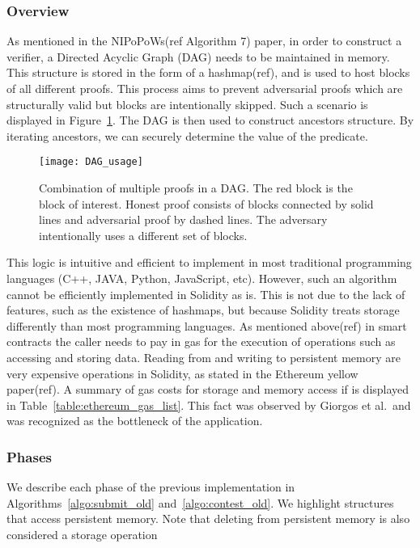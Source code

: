 \subsubsection{Overview} As mentioned in the NIPoPoWs(ref Algorithm 7) paper,
in order to construct a verifier, a Directed Acyclic Graph (DAG) needs to be
maintained in memory. This structure is stored in the form of a hashmap(ref),
and is used to host blocks of all different proofs. This process aims to
prevent adversarial proofs which are structurally valid but blocks are
intentionally skipped. Such a scenario is displayed in
Figure~\ref{fig:DAG_usage}. The DAG is then used to construct ancestors
structure. By iterating ancestors, we can securely determine the value of the
predicate.

\begin{figure}[hbt]
    \centering
    \texttt{[image: DAG\_usage]}
    \caption{Combination of multiple proofs in a DAG. The red block is the
        block of interest. Honest proof consists of blocks connected by solid
        lines and adversarial proof by dashed lines. The adversary
        intentionally uses a different set of blocks.}
    \label{fig:DAG_usage}
\end{figure}

This logic is intuitive and efficient to implement in most traditional
programming languages (C++, JAVA, Python, JavaScript, etc). However, such an
algorithm cannot be efficiently implemented in Solidity as is. This is not due
to the lack of features, such as the existence of hashmaps, but because
Solidity treats storage differently than most programming languages. As
mentioned above(ref) in smart contracts the caller needs to pay in gas for the
execution of operations such as accessing and storing data. Reading from and
writing to persistent memory are very expensive operations in Solidity, as
stated in the Ethereum yellow paper(ref). A summary of gas costs for storage
and memory access if is displayed in Table~\ref{table:ethereum_gas_list}. This
fact was observed by Giorgos et al.\ and was recognized as the bottleneck of
the application.



\subsubsection{Phases}

We describe each phase of the previous implementation in
Algorithms~\ref{algo:submit_old} and~\ref{algo:contest_old}. We highlight
structures that access persistent memory. Note that deleting from persistent
memory is also considered a storage operation

